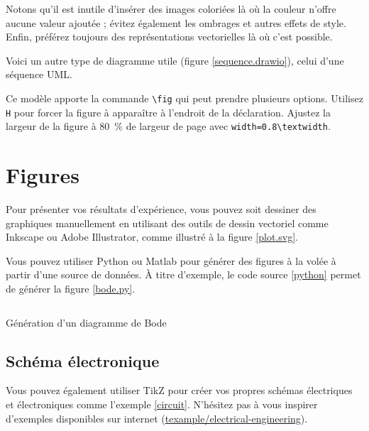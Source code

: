 
Notons qu'il est inutile d'insérer des images coloriées là où la couleur n'offre aucune valeur ajoutée ; évitez également les ombrages et autres effets de style. Enfin, préférez toujours des représentations vectorielles là où c'est possible.

Voici un autre type de diagramme utile (figure \ref{sequence.drawio}), celui d'une séquence UML.


Ce modèle apporte la commande \verb!\fig! qui peut prendre plusieurs options. Utilisez \verb!H! pour forcer la figure à apparaître à l'endroit de la déclaration. Ajustez la largeur de la figure à \SI{80}{\percent} de largeur de page avec \verb!width=0.8\textwidth!.

\section{Figures}

Pour présenter vos résultats d'expérience, vous pouvez soit dessiner des graphiques manuellement en utilisant des outils de dessin vectoriel comme Inkscape ou Adobe Illustrator, comme illustré à la figure \ref{plot.svg}.


Vous pouvez utiliser Python ou Matlab pour générer des figures à la volée à partir d'une source de données. À titre d'exemple, le code source \ref{python} permet de générer la figure \ref{bode.py}.
\begin{listing}[h]
    \inputminted{python}{assets/figures/bode.py}
    \caption{Génération d'un diagramme de Bode \label{python}}
\end{listing}


\subsection{Schéma électronique}
Vous pouvez également utiliser TikZ pour créer vos propres schémas électriques et électroniques comme l'exemple \ref{circuit}. N'hésitez pas à vous inspirer d'exemples disponibles sur internet (\href{https://texample.net/tikz/examples/area/electrical-engineering/}{texample/electrical-engineering}).

